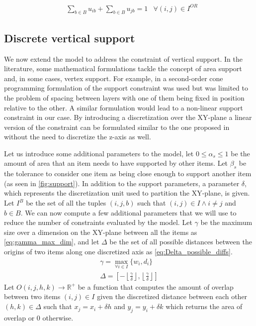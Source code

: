 \begin{align}
    & \sum\limits_{b \in B} u_{ib} + \sum\limits_{b \in B} u_{jb} = 1 & \forall (i, j) \in I^{OR} \label{cons:all_items_in_bin_with_rotation}
\end{align}

\subsection*{Discrete vertical support}
\label{subsec:vertical_support_formulation}%

We now extend the model to address the constraint of vertical support.
In the literature, some mathematical formulations tackle the concept of area support and, in some cases, vertex support. For example, in \cite{GZARA20201062} a second-order cone programming formulation of the support constraint was used but was limited to the problem of spacing between layers with one of them being fixed in position relative to the other. A similar formulation would lead to a non-linear support constraint in our case.
By introducing a discretization over the XY-plane a linear version of the constraint can be formulated similar to the one proposed in \cite{kurpel2020exact} without the need to discretize the z-axis as well.

Let us introduce some additional parameters to the model, let $0 \le \alpha_s \le 1$ be the amount of area that an item needs to have supported by other items. Let $\beta_s$ be the tolerance to consider one item as being close enough to support another item (as seen in \cref{fig:support}).
In addition to the support parameters, a parameter $\delta$, which represents the discretization unit used to partition the XY-plane, is given. Let $I^B$ be the set of all the tuples $(i, j, b)$ such that $(i,j) \in I \land i \neq j$ and $b \in B$.
We can now compute a few additional parameters that we will use to reduce the number of constraints evaluated by the model. Let $\gamma$ be the maximum size over a dimension on the XY-plane between all the items as \cref{eq:gamma_max_dim}, and let $\Delta$ be the set of all possible distances between the origins of two items along one discretized axis as \cref{eq:Delta_possible_diffs}.
\begin{align}
    \gamma = \max_{\forall i \in I}\{ w_i, d_i \} \label{eq:gamma_max_dim} \\
    \Delta =  \left[ - \left\lfloor \frac{ \gamma }{\delta} \right\rfloor, \left\lfloor \frac{ \gamma }{\delta} \right\rfloor \right] \label{eq:Delta_possible_diffs}
\end{align}
Let $O(i, j, h, k) \rightarrow \mathbb{R}^+$ be a function that computes the amount of overlap between two items $(i,j) \in I$ given the discretized distance between each other $(h, k) \in \Delta$ such that $x_j = x_i + \delta h$ and $y_j = y_i + \delta k$ which returns the area of overlap or 0 otherwise.

